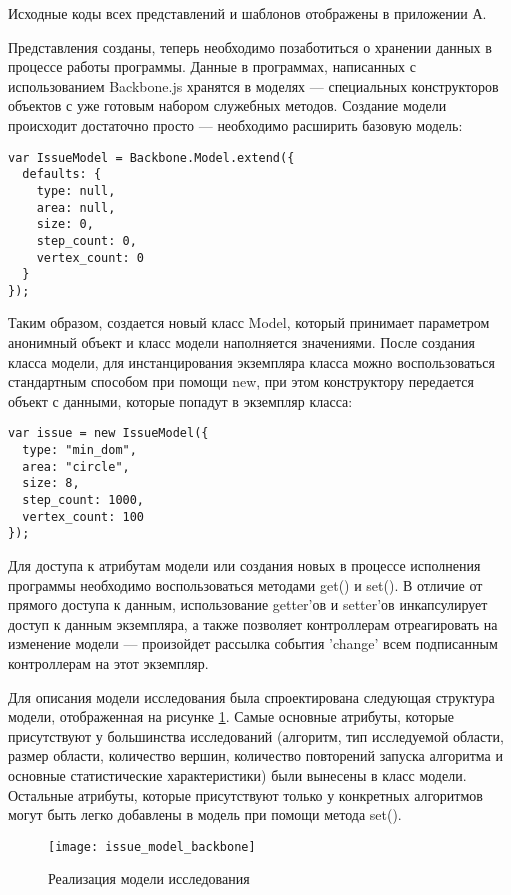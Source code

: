 Исходные коды всех представлений и шаблонов отображены в приложении А.

Представления созданы, теперь необходимо позаботиться о хранении данных в процессе работы программы. Данные в программах, написанных с использованием Backbone.js хранятся в моделях --- специальных конструкторов объектов с уже готовым набором служебных методов. Создание модели происходит достаточно просто --- необходимо расширить базовую модель:
\begin{lstlisting}
var IssueModel = Backbone.Model.extend({
  defaults: {
    type: null,
    area: null,
    size: 0,
    step_count: 0,
    vertex_count: 0
  }
});
\end{lstlisting}
Таким образом, создается новый класс Model, который принимает параметром анонимный объект и класс модели наполняется значениями. После создания класса модели, для инстанцирования экземпляра класса можно воспользоваться стандартным способом при помощи new, при этом конструктору передается объект с данными, которые попадут в экземпляр класса:
\begin{lstlisting}
var issue = new IssueModel({
  type: "min_dom",
  area: "circle",
  size: 8,
  step_count: 1000,
  vertex_count: 100
});
\end{lstlisting}
Для доступа к атрибутам модели или создания новых в процессе исполнения программы необходимо воспользоваться методами get() и set(). В отличие от прямого доступа к данным, использование getter'ов и setter'ов инкапсулирует доступ к данным экземпляра, а также позволяет контроллерам отреагировать на изменение модели --- произойдет рассылка события 'change' всем подписанным контроллерам на этот экземпляр.

Для описания модели исследования была спроектирована следующая структура модели, отображенная на рисунке \ref{issue_model_backbone}. Самые основные атрибуты, которые присутствуют у большинства исследований (алгоритм, тип исследуемой области, размер области, количество вершин, количество повторений запуска алгоритма и основные статистические характеристики) были вынесены в класс модели. Остальные атрибуты, которые присутствуют только у конкретных алгоритмов могут быть легко добавлены в модель при помощи метода set().

\begin{figure}[ht]
\center\texttt{[image: issue\_model\_backbone]}
\caption{Реализация модели исследования}\label{issue_model_backbone}
\end{figure}

